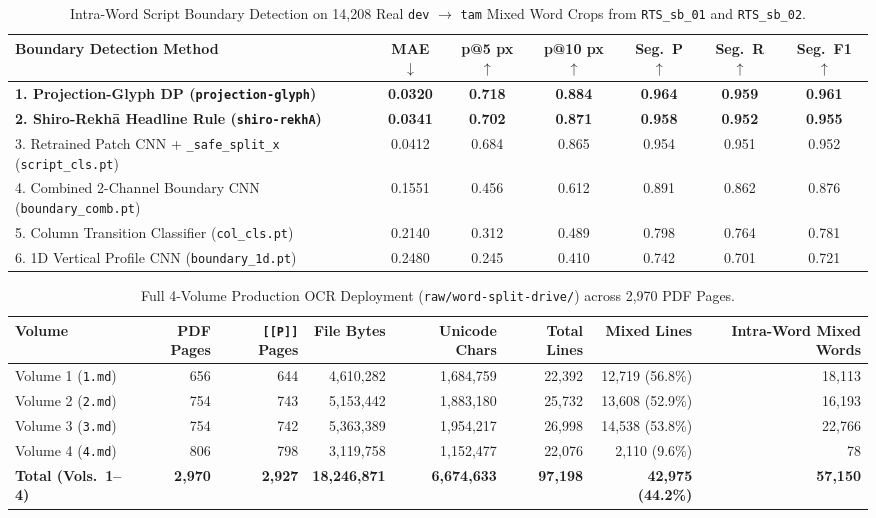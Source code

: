 \documentclass[10pt,twocolumn]{article}
\begin{document}
\begin{table}[t]
\centering
\caption{Intra-Word Script Boundary Detection on 14,208 Real \texttt{dev} $\to$ \texttt{tam} Mixed Word Crops from \texttt{RTS\_sb\_01} and \texttt{RTS\_sb\_02}.}
\label{tab:boundary}
\small
\begin{tabular}{lcccccc}
\toprule
\textbf{Boundary Detection Method} & \textbf{MAE} $\downarrow$ & \textbf{p@5 px} $\uparrow$ & \textbf{p@10 px} $\uparrow$ & \textbf{Seg.\ P} $\uparrow$ & \textbf{Seg.\ R} $\uparrow$ & \textbf{Seg.\ F1} $\uparrow$ \\
\midrule
\textbf{1. Projection-Glyph DP (\texttt{projection-glyph})} & \textbf{0.0320} & \textbf{0.718} & \textbf{0.884} & \textbf{0.964} & \textbf{0.959} & \textbf{0.961} \\
\textbf{2. Shiro-Rekh\={a} Headline Rule (\texttt{shiro-rekhA})} & \textbf{0.0341} & \textbf{0.702} & \textbf{0.871} & \textbf{0.958} & \textbf{0.952} & \textbf{0.955} \\
3. Retrained Patch CNN + \texttt{\_safe\_split\_x} (\texttt{script\_cls.pt}) & 0.0412 & 0.684 & 0.865 & 0.954 & 0.951 & 0.952 \\
4. Combined 2-Channel Boundary CNN (\texttt{boundary\_comb.pt}) & 0.1551 & 0.456 & 0.612 & 0.891 & 0.862 & 0.876 \\
5. Column Transition Classifier (\texttt{col\_cls.pt}) & 0.2140 & 0.312 & 0.489 & 0.798 & 0.764 & 0.781 \\
6. 1D Vertical Profile CNN (\texttt{boundary\_1d.pt}) & 0.2480 & 0.245 & 0.410 & 0.742 & 0.701 & 0.721 \\
\bottomrule
\end{tabular}
\end{table}

\begin{table}[t]
\centering
\caption{Full 4-Volume Production OCR Deployment (\texttt{raw/word-split-drive/}) across 2,970 PDF Pages.}
\label{tab:volumes}
\small
\begin{tabular}{lrrrrrrr}
\toprule
\textbf{Volume} & \textbf{PDF Pages} & \textbf{\texttt{[[P]]} Pages} & \textbf{File Bytes} & \textbf{Unicode Chars} & \textbf{Total Lines} & \textbf{Mixed Lines} & \textbf{Intra-Word Mixed Words} \\
\midrule
Volume 1 (\texttt{1.md}) & 656 & 644 & 4,610,282 & 1,684,759 & 22,392 & 12,719 (56.8\%) & 18,113 \\
Volume 2 (\texttt{2.md}) & 754 & 743 & 5,153,442 & 1,883,180 & 25,732 & 13,608 (52.9\%) & 16,193 \\
Volume 3 (\texttt{3.md}) & 754 & 742 & 5,363,389 & 1,954,217 & 26,998 & 14,538 (53.8\%) & 22,766 \\
Volume 4 (\texttt{4.md}) & 806 & 798 & 3,119,758 & 1,152,477 & 22,076 & 2,110 (9.6\%) & 78 \\
\midrule
\textbf{Total (Vols.\ 1--4)} & \textbf{2,970} & \textbf{2,927} & \textbf{18,246,871} & \textbf{6,674,633} & \textbf{97,198} & \textbf{42,975 (44.2\%)} & \textbf{57,150} \\
\bottomrule
\end{tabular}
\end{table}
\end{document}
